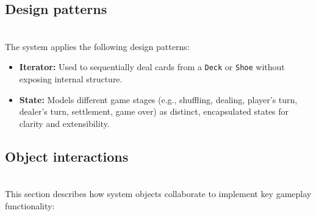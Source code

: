 \subsection{Design patterns}\label{NPdB6wb4ABdpeEeTFv-sr}
\\
The system applies the following design patterns:

\begin{itemize}
\item
\protect{}\label{VHy3i59cReWrQ_V9Yuc9E}
\textbf{Iterator:} Used to sequentially deal cards from a \texttt{Deck} or \texttt{Shoe} without exposing internal structure.
\item
\protect{}\label{fqL6-uu8ogFgZxml3AhEV}
\textbf{State:} Models different game stages (e.g., shuffling, dealing, player's turn, dealer's turn, settlement, game over) as distinct, encapsulated states for clarity and extensibility.
\end{itemize}

\subsection{Object interactions}\label{wC75LyNCLj0zRCiVvwYmp}
\\
This section describes how system objects collaborate to implement key gameplay functionality:

